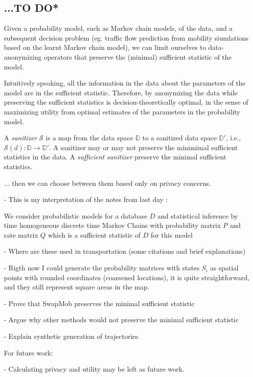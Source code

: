 \documentclass[]{llncs}
\begin{document}
\subsection{...TO DO*}

Given a probability model, such as Markov chain models, of the data, and a subsequent decision problem (eg. traffic flow prediction from mobility siumlations based on the learnt Markov chain model), we can limit ourselves to data-anonymizing operators that preserve the (minimal) sufficient statistic of the model.

Intuitively speaking, all the information in the data about the parameters of the model are in the sufficient statistic.
Therefore, by anonymizing the data while preserving the sufficient statistics is decision-theoretically optimal, in the sense of maximizing utility from optimal estimates of the parameters in the probability model. 

A {\em sanitizer} $\mathcal{S}$ is a map from the data space $\mathbb{D}$ to a sanitized data space $\mathbb{D}'$, i.e., $\mathcal{S}(d): \mathbb{D} \to \mathbb{D}'$. 
A sanitizer may or may not preserve the minimimal sufficient statistics in the data. 
A {\em sufficient sanitizer} preserve the minimal sufficient statistics.

... then we can choose between them based only on privacy concerns.


- This is my interpretation of the notes from last day :

We consider probabilistic models for a database $D$ and statistical inference by time homogeneous discrete time Markov Chains with probability matrix $P$ and rate matrix $Q$ which is a sufficient statistic of $D$ for this model 

- Where are these used in transportation (some citations and brief explanations)

- Rigth now I could generate the probability matrices with states $S_i$ as spatial points with rounded coordinates (coarsened locations), it is quite straightforward, and they still represent square areas in the map.

- Prove that SwapMob preserves the minimal sufficient statistic

- Argue why other methods would not preserve the minimal sufficient statistic 

- Explain synthetic generation of trajectories 

For future work:

- Calculating privacy and utility may be left as future work.
\end{document}
